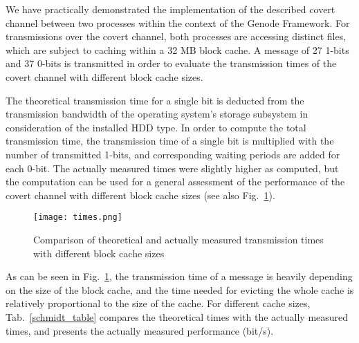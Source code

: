 \documentclass[runningheads,a4paper]{llncs}
\begin{document}
We have practically demonstrated the implementation of the described covert channel between two processes within the context of the Genode Framework.
For transmissions over the covert channel, both processes are accessing distinct files, which are subject to caching within a 32 MB block cache.
A message of 27 1-bits and 37 0-bits is transmitted in order to evaluate the transmission times of the covert channel with different block cache sizes.

The theoretical transmission time for a single bit is deducted from the transmission bandwidth of the operating system's storage subsystem in consideration of the installed HDD type.
In order to compute the total transmission time, the transmission time of a single bit is multiplied with the number of transmitted 1-bits, and corresponding waiting periods are added for each 0-bit.
The actually measured times were slightly higher as computed, but the computation can be used for a general assessment of the performance of the covert channel with different block cache sizes (see also Fig.~\ref{times}).

\begin{figure}[!ht]
\texttt{[image: times.png]}
\caption{Comparison of theoretical and actually measured transmission times with different block cache sizes}
\label{times}
\end{figure}

As can be seen in Fig.~\ref{times}, the transmission time of a message is heavily depending on the size of the block cache, and the time needed for evicting the whole cache is relatively proportional to the size of the cache.
For different cache sizes, Tab.~\ref{schmidt_table} compares the theoretical times with the actually measured times, and presents the actually measured performance (bit/s).
\end{document}

